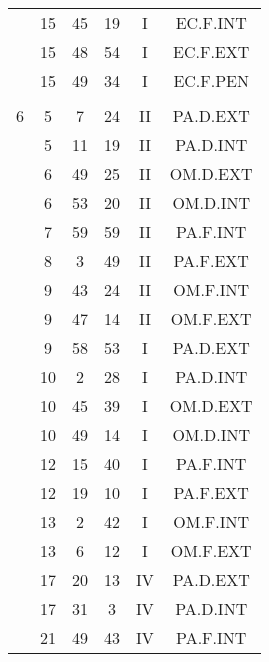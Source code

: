 \documentclass[12pt, a4paper]{article}
\begin{document}
\begin{multicols}{3}
{\begin{tabular}{c c c c c c}
	 	 	 	 & 15 & 45 & 19 & I & EC.F.INT\\%
	 	 	 	 & 15 & 48 & 54 & I & EC.F.EXT\\%
	 	 	 	 & 15 & 49 & 34 & I & EC.F.PEN\\%
	 	 	 	 & & & & & \\%
	 	 	 	6 & 5 & 7 & 24 & II & PA.D.EXT\\%
	 	 	 	 & 5 & 11 & 19 & II & PA.D.INT\\%
	 	 	 	 & 6 & 49 & 25 & II & OM.D.EXT\\%
	 	 	 	 & 6 & 53 & 20 & II & OM.D.INT\\%
	 	 	 	 & 7 & 59 & 59 & II & PA.F.INT\\%
	 	 	 	 & 8 & 3 & 49 & II & PA.F.EXT\\%
	 	 	 	 & 9 & 43 & 24 & II & OM.F.INT\\%
	 	 	 	 & 9 & 47 & 14 & II & OM.F.EXT\\%
	 	 	 	 & 9 & 58 & 53 & I & PA.D.EXT\\%
	 	 	 	 & 10 & 2 & 28 & I & PA.D.INT\\%
	 	 	 	 & 10 & 45 & 39 & I & OM.D.EXT\\%
	 	 	 	 & 10 & 49 & 14 & I & OM.D.INT\\%
	 	 	 	 & 12 & 15 & 40 & I & PA.F.INT\\%
	 	 	 	 & 12 & 19 & 10 & I & PA.F.EXT\\%
	 	 	 	 & 13 & 2 & 42 & I & OM.F.INT\\%
	 	 	 	 & 13 & 6 & 12 & I & OM.F.EXT\\%
	 	 	 	 & 17 & 20 & 13 & IV & PA.D.EXT\\%
	 	 	 	 & 17 & 31 & 3 & IV & PA.D.INT\\%
	 	 	 	 & 21 & 49 & 43 & IV & PA.F.INT\\%

\end{tabular}}
\end{multicols}
\end{document}
